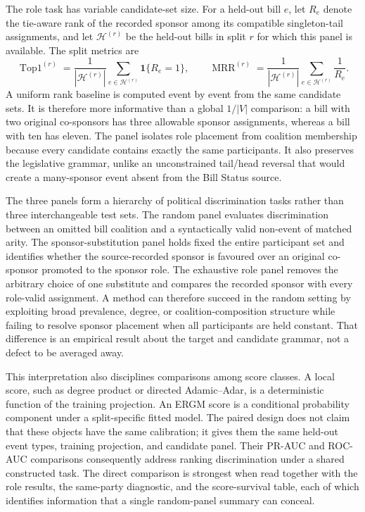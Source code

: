 \documentclass{nws}
\begin{document}
The role task has variable candidate-set size. For a held-out bill $e$, let $R_e$ denote the tie-aware rank of the recorded sponsor among its compatible singleton-tail assignments, and let $\mathcal{H}^{(r)}$ be the held-out bills in split $r$ for which this panel is available. The split metrics are
\begin{equation}
 \operatorname{Top1}^{(r)}=
 \frac{1}{|\mathcal{H}^{(r)}|}\sum_{e\in\mathcal{H}^{(r)}}\mathbf{1}\{R_e=1\},
 \qquad
 \operatorname{MRR}^{(r)}=
 \frac{1}{|\mathcal{H}^{(r)}|}\sum_{e\in\mathcal{H}^{(r)}}\frac{1}{R_e}.
 \label{eq:role-metrics-main}
\end{equation}
A uniform rank baseline is computed event by event from the same candidate sets. It is therefore more informative than a global $1/|V|$ comparison: a bill with two original co-sponsors has three allowable sponsor assignments, whereas a bill with ten has eleven. The panel isolates role placement from coalition membership because every candidate contains exactly the same participants. It also preserves the legislative grammar, unlike an unconstrained tail/head reversal that would create a many-sponsor event absent from the Bill Status source.

The three panels form a hierarchy of political discrimination tasks rather than three interchangeable test sets. The random panel evaluates discrimination between an omitted bill coalition and a syntactically valid non-event of matched arity. The sponsor-substitution panel holds fixed the entire participant set and identifies whether the source-recorded sponsor is favoured over an original co-sponsor promoted to the sponsor role. The exhaustive role panel removes the arbitrary choice of one substitute and compares the recorded sponsor with every role-valid assignment. A method can therefore succeed in the random setting by exploiting broad prevalence, degree, or coalition-composition structure while failing to resolve sponsor placement when all participants are held constant. That difference is an empirical result about the target and candidate grammar, not a defect to be averaged away.

This interpretation also disciplines comparisons among score classes. A local score, such as degree product or directed Adamic--Adar, is a deterministic function of the training projection. An ERGM score is a conditional probability component under a split-specific fitted model. The paired design does not claim that these objects have the same calibration; it gives them the same held-out event types, training projection, and candidate panel. Their PR-AUC and ROC-AUC comparisons consequently address ranking discrimination under a shared constructed task. The direct comparison is strongest when read together with the role results, the same-party diagnostic, and the score-survival table, each of which identifies information that a single random-panel summary can conceal.
\end{document}
